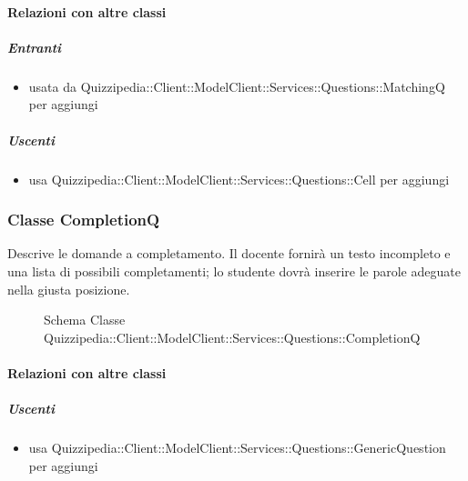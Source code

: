 \paragraph{Relazioni con altre classi}
\subparagraph{Entranti}
\begin{itemize}
\item usata da Quizzipedia::Client::ModelClient::Services::Questions::MatchingQ per aggiungi
\end{itemize}
\subparagraph{Uscenti}
\begin{itemize}
\item usa Quizzipedia::Client::ModelClient::Services::Questions::Cell per aggiungi
\end{itemize}
\subsubsection{Classe CompletionQ}
Descrive le domande a completamento. Il docente fornirà un testo incompleto e una lista di possibili completamenti; lo studente dovrà inserire le parole adeguate nella giusta posizione.
\begin{figure}[H]
\centering
\noindent{}
\caption[Schema Classe CompletionQ]{Schema Classe Quizzipedia::Client::ModelClient::Services::Questions::CompletionQ}
\end{figure}
\paragraph{Relazioni con altre classi}
\subparagraph{Uscenti}
\begin{itemize}
\item usa Quizzipedia::Client::ModelClient::Services::Questions::GenericQuestion per aggiungi
\end{itemize}
